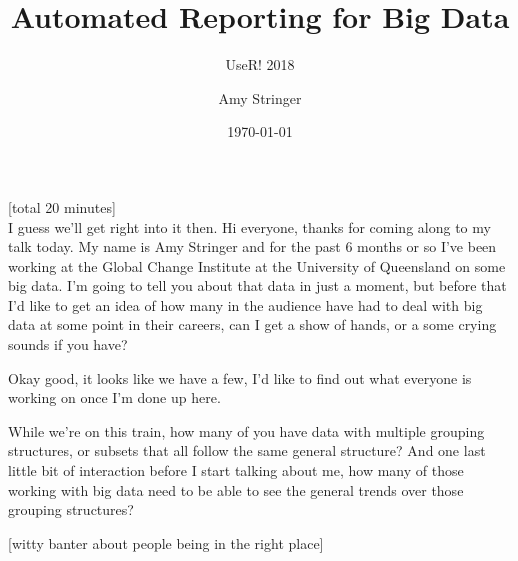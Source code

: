 \documentclass[a4paper]{scrartcl}
\title{Automated Reporting for Big Data}
\subtitle{UseR! 2018}
\author{Amy Stringer}
\date{\today}
\begin{document}
\maketitle

[total 20 minutes] \\

I guess we'll get right into it then. Hi everyone, thanks for coming along to my talk today. My name is Amy Stringer and for the past 6 months or so I've been working at the Global Change Institute at the University of Queensland on some big data. I'm going to tell you about that data in just a moment, but before that I'd like to get an idea of how many in the audience have had to deal with big data at some point in their careers, can I get a show of hands, or a some crying sounds if you have?

Okay good, it looks like we have a few, I'd like to find out what everyone is working on once I'm done up here.

While we're on this train, how many of you have data with multiple grouping structures, or subsets that all follow the same general structure? And one last little bit of interaction before I start talking about me, how many of those working with big data need to be able to see the general trends over those grouping structures?

[witty banter about people being in the right place]
\end{document}
